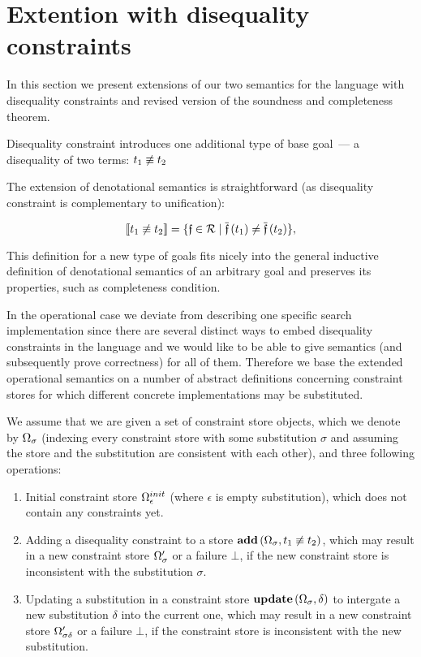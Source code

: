 \section{Extention with disequality constraints}

In this section we present extensions of our two semantics for the language with disequality constraints and revised version of the soundness and completeness theorem.

Disequality constraint introduces one additional type of base goal~--- a disequality of two terms: $t_1 \not\equiv t_2$

The extension of denotational semantics is straightforward (as disequality constraint is complementary to unification):

\[ \llbracket{t_1 \not\equiv t_2}\rrbracket  =  \{\mathfrak{f} \in \mathcal{R} \mid \overline{\mathfrak{f}}\,(t_1) \neq \overline{\mathfrak{f}}\,(t_2)\}, \]

This definition for a new type of goals fits nicely into the general inductive definition of denotational semantics of an arbitrary goal
and preserves its properties, such as completeness condition.

In the operational case we deviate from describing one specific search implementation since there are several distinct ways to embed disequality constraints
in the language and we would like to be able to give semantics (and subsequently prove correctness) for all of them. Therefore we base the extended operational
semantics on a number of abstract definitions concerning constraint stores for which different concrete implementations may be substituted.

We assume that we are given a set of constraint store objects, which we denote by $\Omega_\sigma$ (indexing every constraint store with
some substitution $\sigma$ and assuming the store and the substitution are consistent with each other), and three following operations:

\begin{enumerate}
\item Initial constraint store $\Omega_\epsilon^{init}$ (where $\epsilon$ is empty substitution), which does not contain any constraints yet.
\item Adding a disequality constraint to a store $\mathbf{add}\,(\Omega_\sigma, t_1 \not\equiv t_2)$, which may result in a new constraint store $\Omega^\prime_\sigma$ or a failure $\bot$,
  if the new constraint store is inconsistent with the substitution $\sigma$.
\item Updating a substitution in a constraint store $\mathbf{update}\,(\Omega_\sigma, \delta)$ to intergate a new substitution $\delta$ into the current one,
  which may result in a new constraint store $\Omega^\prime_{\sigma \delta}$ or a failure $\bot$, if the constraint store is inconsistent with the new substitution.
\end{enumerate}

